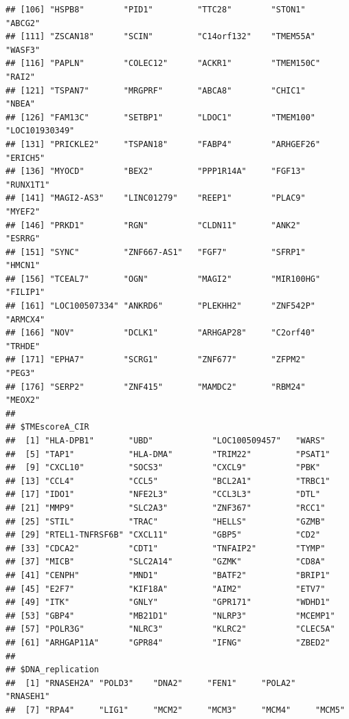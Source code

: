 \documentclass[
  12pt,
]{book}
\begin{document}
\begin{verbatim}
## [106] "HSPB8"        "PID1"         "TTC28"        "STON1"        "ABCG2"       
## [111] "ZSCAN18"      "SCIN"         "C14orf132"    "TMEM55A"      "WASF3"       
## [116] "PAPLN"        "COLEC12"      "ACKR1"        "TMEM150C"     "RAI2"        
## [121] "TSPAN7"       "MRGPRF"       "ABCA8"        "CHIC1"        "NBEA"        
## [126] "FAM13C"       "SETBP1"       "LDOC1"        "TMEM100"      "LOC101930349"
## [131] "PRICKLE2"     "TSPAN18"      "FABP4"        "ARHGEF26"     "ERICH5"      
## [136] "MYOCD"        "BEX2"         "PPP1R14A"     "FGF13"        "RUNX1T1"     
## [141] "MAGI2-AS3"    "LINC01279"    "REEP1"        "PLAC9"        "MYEF2"       
## [146] "PRKD1"        "RGN"          "CLDN11"       "ANK2"         "ESRRG"       
## [151] "SYNC"         "ZNF667-AS1"   "FGF7"         "SFRP1"        "HMCN1"       
## [156] "TCEAL7"       "OGN"          "MAGI2"        "MIR100HG"     "FILIP1"      
## [161] "LOC100507334" "ANKRD6"       "PLEKHH2"      "ZNF542P"      "ARMCX4"      
## [166] "NOV"          "DCLK1"        "ARHGAP28"     "C2orf40"      "TRHDE"       
## [171] "EPHA7"        "SCRG1"        "ZNF677"       "ZFPM2"        "PEG3"        
## [176] "SERP2"        "ZNF415"       "MAMDC2"       "RBM24"        "MEOX2"       
## 
## $TMEscoreA_CIR
##  [1] "HLA-DPB1"       "UBD"            "LOC100509457"   "WARS"          
##  [5] "TAP1"           "HLA-DMA"        "TRIM22"         "PSAT1"         
##  [9] "CXCL10"         "SOCS3"          "CXCL9"          "PBK"           
## [13] "CCL4"           "CCL5"           "BCL2A1"         "TRBC1"         
## [17] "IDO1"           "NFE2L3"         "CCL3L3"         "DTL"           
## [21] "MMP9"           "SLC2A3"         "ZNF367"         "RCC1"          
## [25] "STIL"           "TRAC"           "HELLS"          "GZMB"          
## [29] "RTEL1-TNFRSF6B" "CXCL11"         "GBP5"           "CD2"           
## [33] "CDCA2"          "CDT1"           "TNFAIP2"        "TYMP"          
## [37] "MICB"           "SLC2A14"        "GZMK"           "CD8A"          
## [41] "CENPH"          "MND1"           "BATF2"          "BRIP1"         
## [45] "E2F7"           "KIF18A"         "AIM2"           "ETV7"          
## [49] "ITK"            "GNLY"           "GPR171"         "WDHD1"         
## [53] "GBP4"           "MB21D1"         "NLRP3"          "MCEMP1"        
## [57] "POLR3G"         "NLRC3"          "KLRC2"          "CLEC5A"        
## [61] "ARHGAP11A"      "GPR84"          "IFNG"           "ZBED2"         
## 
## $DNA_replication
##  [1] "RNASEH2A" "POLD3"    "DNA2"     "FEN1"     "POLA2"    "RNASEH1" 
##  [7] "RPA4"     "LIG1"     "MCM2"     "MCM3"     "MCM4"     "MCM5"    

\end{verbatim}
\end{document}
